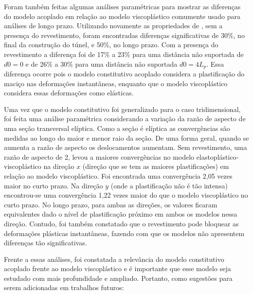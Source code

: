 Foram também feitas algumas análises paramétricas para mostrar as diferenças do modelo acoplado em relação ao modelo viscoplástico comumente usado para análises de longo prazo. Utilizando novamente as propriedades de , sem a presença do revestimento, foram encontradas diferenças significativas de 30\%, no final da construção do túnel, e 50\%, no longo prazo. Com a presença do revestimento a diferença foi de 17\% a 23\% para uma distância não suportada de $d0=0$ e de 26\% a 30\% para uma distância não suportada $d0=4L_p$. Essa diferença ocorre pois o modelo constitutivo acoplado considera a plastificação do maciço nas deformações instantâneas, enquanto que o modelo viscoplástico considera essas deformações como elásticas.

Uma vez que o modelo constitutivo foi generalizado para o caso tridimensional, foi feita uma análise paramétrica considerando a variação da razão de aspecto de uma seção transversal elíptica. Como a seção é elíptica as convergências são medidas ao longo do maior e menor raio da seção. De uma forma geral, quando se aumenta a razão de aspecto os deslocamentos aumentam. Sem revestimento, uma razão de aspecto de 2, levou a maiores convergências no modelo elastoplástico-viscoplástico na direção $x$ (direção que se tem as maiores plastificações) em relação ao modelo viscoplástico. Foi encontrada uma convergência 2,05 vezes maior no curto prazo. Na direção $y$ (onde a plastificação não é tão intensa) encontrou-se uma convergência 1,22 vezes maior do que o modelo viscoplástico no curto prazo. No longo prazo, para ambas as direções, os valores ficaram equivalentes dado o nível de plastificação próximo em ambos os modelos nessa direção. Contudo, foi também constatado que o revestimento pode bloquear as deformações plásticas instantâneas, fazendo com que os modelos não apresentem diferenças tão significativas.

Frente a essas análises, foi constatada a relevância do modelo constitutivo acoplado frente ao modelo viscoplástico e é importante que esse modelo seja estudado com mais profundidade e ampliado. Portanto, como sugestões para serem adicionadas em trabalhos futuros:


